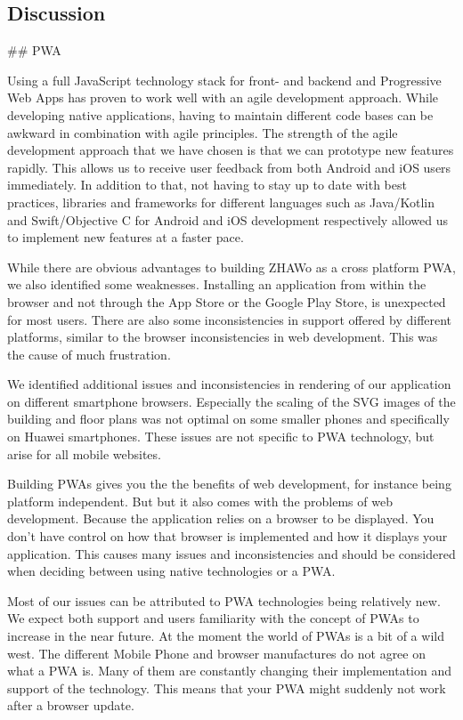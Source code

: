 \begin{markdown}
\section{Discussion} \label{discussion}

## PWA

Using a full JavaScript technology stack for front- and backend and Progressive Web Apps has proven to work well with an agile development approach. While developing native applications, having to maintain different code bases can be awkward in combination with agile principles. The strength of the agile development approach that we have chosen is that we can prototype new features rapidly. This allows us to receive user feedback from both Android and iOS users immediately. In addition to that, not having to stay up to date with best practices, libraries and frameworks for different languages such as Java/Kotlin and Swift/Objective C for Android and iOS development respectively allowed us to implement new features at a faster pace.


While there are obvious advantages to building ZHAWo as a cross platform PWA, we also identified some weaknesses. Installing an application from within the browser and not through the App Store or the Google Play Store, is unexpected for most users. There are also some inconsistencies in support offered by different platforms, similar to the browser inconsistencies in web development. This was the cause of much frustration. 

We identified additional issues and inconsistencies in rendering of our application on different smartphone browsers. Especially the scaling of the SVG images of the building and floor plans was not optimal on some smaller phones and specifically on Huawei smartphones. These issues are not specific to PWA technology, but arise for all mobile websites.


Building PWAs gives you the the benefits of web development, for instance being platform independent. But but it also comes with the problems of web development. Because the application relies on a browser to be displayed. You don't have control on how that browser is implemented and how it displays your application. This causes many issues and inconsistencies and should be considered when deciding between using native technologies or a PWA.


Most of our issues can be attributed to PWA technologies being relatively new. We expect both support and users familiarity with the concept of PWAs to increase in the near future. At the moment the world of PWAs is a bit of a wild west. The different Mobile Phone and browser manufactures do not agree on what a PWA is. Many of them are constantly changing their implementation and support of the technology. This means that your PWA might suddenly not work after a browser update.


\end{markdown}
